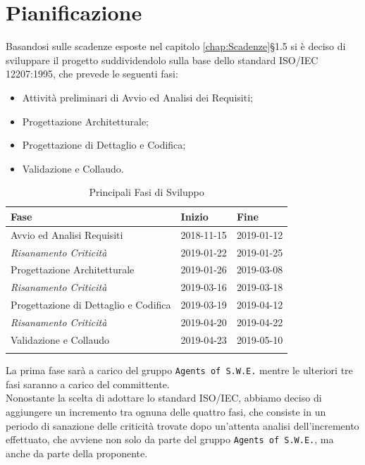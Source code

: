 \section{Pianificazione}

Basandosi sulle scadenze esposte nel capitolo \autoref{chap:Scadenze}§1.5 si è deciso di sviluppare il progetto suddividendolo sulla base dello standard ISO/IEC 12207:1995, che prevede le seguenti fasi:
\begin{itemize}
	\item Attività preliminari di Avvio ed Analisi dei Requisiti;
	\item Progettazione Architetturale;
	\item Progettazione di Dettaglio e Codifica;
	\item Validazione e Collaudo.
\end{itemize}

\begin{longtable}{|C{.46\textwidth}|C{.20\textwidth}|C{.20\textwidth}|}
\hline
\textbf{Fase} & \textbf{Inizio} & \textbf{Fine}\\
\hline \hline
\endfirsthead
\hline
Avvio ed Analisi Requisiti & 2018-11-15 & 2019-01-12 \\
\hline
\textit{Risanamento Criticità} & 2019-01-22 & 2019-01-25 \\
\hline
Progettazione Architetturale & 2019-01-26 & 2019-03-08 \\
\hline
\textit{Risanamento Criticità} & 2019-03-16 & 2019-03-18 \\
\hline
Progettazione di Dettaglio e Codifica & 2019-03-19 & 2019-04-12 \\
\hline
\textit{Risanamento Criticità} & 2019-04-20 & 2019-04-22 \\
\hline
Validazione e Collaudo & 2019-04-23 & 2019-05-10 \\
\hline
\caption{Principali Fasi di Sviluppo}
\label{Tabella Fasi di Sviluppo}
\end{longtable}

La prima fase sarà a carico del gruppo \texttt{Agents of S.W.E.} mentre le ulteriori tre fasi saranno a carico del committente. \\
Nonostante la scelta di adottare lo standard ISO/IEC, abbiamo deciso di aggiungere un incremento tra ognuna delle quattro fasi, che consiste in un periodo di sanazione delle criticità trovate dopo un'attenta analisi dell'incremento effettuato, che avviene non solo da parte del gruppo \texttt{Agents of S.W.E.}, ma anche da parte della proponente. 


